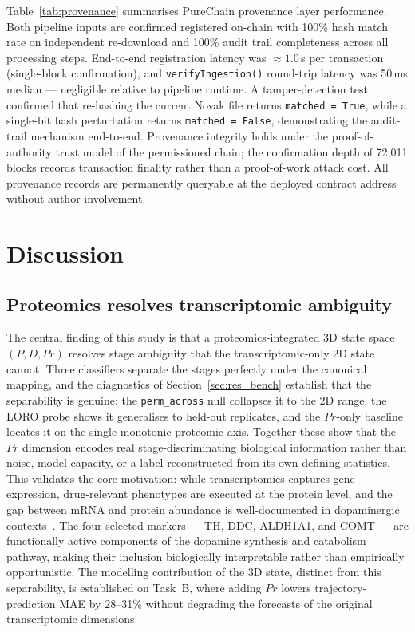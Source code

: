 \documentclass[5p,times,twocolumn]{elsarticle}
\begin{document}
Table~\ref{tab:provenance} summarises PureChain provenance layer
performance.
Both pipeline inputs are confirmed registered on-chain with
100\% hash match rate on independent re-download and 100\% audit
trail completeness across all processing steps.
End-to-end registration latency was $\approx 1.0$\,s per
transaction (single-block confirmation), and
\texttt{verifyIngestion()} round-trip latency was 50\,ms median
--- negligible relative to pipeline runtime.
A tamper-detection test confirmed that re-hashing the current
Novak file returns \texttt{matched = True}, while a single-bit
hash perturbation returns \texttt{matched = False},
demonstrating the audit-trail mechanism end-to-end.
Provenance integrity holds under the proof-of-authority trust
model of the permissioned chain; the confirmation depth of
72,011 blocks records transaction finality rather than a
proof-of-work attack cost.
All provenance records are permanently queryable at the deployed
contract address without author involvement.

\section{Discussion}

\subsection{\textbf{Proteomics resolves transcriptomic
ambiguity}}

The central finding of this study is that a
proteomics-integrated 3D state space $(P, D, Pr)$ resolves
stage ambiguity that the transcriptomic-only 2D state cannot.
Three classifiers separate the stages perfectly under the
canonical mapping, and the diagnostics of
Section~\ref{sec:res_bench} establish that the separability is
genuine: the \texttt{perm\_across} null collapses it to the 2D
range, the LORO probe shows it generalises to held-out
replicates, and the $Pr$-only baseline locates it on the single
monotonic proteomic axis.
Together these show that the $Pr$ dimension encodes real
stage-discriminating biological information rather than noise,
model capacity, or a label reconstructed from its own defining
statistics.
This validates the core motivation: while transcriptomics
captures gene expression, drug-relevant phenotypes are executed
at the protein level, and the gap between mRNA and protein
abundance is well-documented in dopaminergic
contexts~\cite{novak2022single,cavarischia2024proteome}.
The four selected markers --- TH, DDC, ALDH1A1, and COMT ---
are functionally active components of the dopamine synthesis and
catabolism pathway, making their inclusion biologically
interpretable rather than empirically opportunistic.
The modelling contribution of the 3D state, distinct from this
separability, is established on Task~B, where adding $Pr$ lowers
trajectory-prediction MAE by 28--31\% without degrading the
forecasts of the original transcriptomic dimensions.
\end{document}
